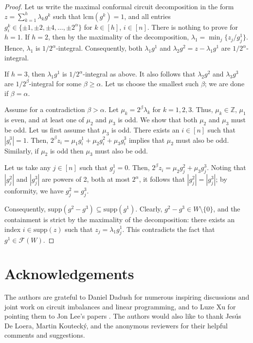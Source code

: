 \documentclass[11pt, a4paper]{article}
\newcommand{\supp}{\mathrm{supp}}
\newcommand{\1}{\mathbbm{1}}
\newcommand{\EE}{\mathcal F}
\newcommand{\lcm}{\mathrm{lcm}}
\theoremstyle{case}
\newcommand{\Z}{\mathbb{Z}}
\begin{document}
\begin{proof}
Let us write the maximal conformal circuit decomposition in the form $z=\sum_{k=1}^h \lambda_k g^k$ such that $\lcm(g^k)=1$, and all entries $g^k_i\in\{\pm1,\pm 2,\pm 4,\ldots,\pm 2^\alpha\}$ for  $k\in [h]$, $i\in[n]$.
There is nothing to prove for $h=1$.
If $h=2$, then by the maximality of the decomposition, $\lambda_1 = \min_j\{{z_{j}}/{g^1_{j}}\}$. Hence, $\lambda_1$ is $1/2^\alpha$-integral. Consequently, both $\lambda_1 g^1$ and $\lambda_2 g^2=z-\lambda_1 g^1$ are  $1/2^\alpha$-integral.

If $h=3$, then
$\lambda_1 g^1$ is $1/2^\alpha$-integral as above. It also follows that  $\lambda_2 g^2$ and $\lambda_3 g^3$ are $1/2^\beta$-integral for some $\beta\ge \alpha$. Let us choose the smallest such $\beta$; we are done if $\beta=\alpha$.

Assume for a contradiction $\beta>\alpha$. Let $\mu_k=2^\beta \lambda_k$ for $k=1,2,3$. Thus, $\mu_k\in\Z$, $\mu_1$ is even, and at least one of $\mu_2$ and $\mu_3$ is odd. We show that both $\mu_2$ and $\mu_3$ must be odd. Let us first assume that $\mu_3$ is odd. There exists an $i\in [n]$ such that $|g^3_i|=1$. Then, $2^\beta z_i=\mu_1 g^1_i+\mu_2 g^2_i+\mu_3 g^3_i$ implies that $\mu_2$ must also be odd. Similarly, if $\mu_2$ is odd then $\mu_3$ must also be odd. 

Let us take any $j\in [n]$ such that $g^1_j=0$. Then, $2^\beta z_i=\mu_2 g^2_j+\mu_3 g^3_j$. Noting that $|g^2_j|$ and $|g^3_j|$ are powers of 2, both at most $2^\alpha$, it follows that $|g^2_j|=|g^3_j|$; by conformity, we have $g^2_j=g^3_j$. 

Consequently, $\supp(g^2-g^3)\subseteq \supp(g^1)$. Clearly, $g^2-g^3\in W\setminus\{ 0\}$, and the containment is strict by the maximality of the decomposition: there exists an index $i\in \supp(z)$ such that $z_j=\lambda_1 g^1_j$. This contradicts the fact that $g^1\in\EE(W)$.
\end{proof}

 
\section*{Acknowledgements}
The authors are grateful to Daniel Dadush for numerous inspiring discussions and joint work on circuit imbalances and linear programming, and to 
Luze Xu for pointing them to Jon Lee's papers \cite{Lee89,Lee90}.
The authors would also like to thank Jes{\'u}s De Loera, Martin Kouteck{\'{y}}, and the anonymous reviewers for their helpful comments and suggestions.
 
\end{document}

